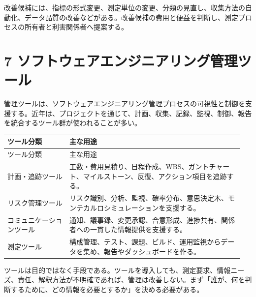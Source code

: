 \documentclass[a4paper,11pt]{ltjsarticle}
\begin{document}
改善候補には、指標の形式変更、測定単位の変更、分類の見直し、収集方法の自動化、データ品質の改善などがある。改善候補の費用と便益を判断し、測定プロセスの所有者と利害関係者へ提案する。

\section{7 ソフトウェアエンジニアリング管理ツール}
管理ツールは、ソフトウェアエンジニアリング管理プロセスの可視性と制御を支援する。近年は、プロジェクトを通じて、計画、収集、記録、監視、制御、報告を統合するツール群が使われることが多い。

\begin{longtable}{>{\raggedright\arraybackslash}p{0.25\linewidth}>{\raggedright\arraybackslash}p{0.70\linewidth}}
\toprule
ツール分類 & 主な用途 \\
\midrule
\endfirsthead
\toprule
ツール分類 & 主な用途 \\
\midrule
\endhead
計画・追跡ツール & 工数・費用見積り、日程作成、WBS、ガントチャート、マイルストーン、反復、アクション項目を追跡する。 \\
リスク管理ツール & リスク識別、分析、監視、確率分布、意思決定木、モンテカルロシミュレーションを支援する。 \\
コミュニケーションツール & 通知、議事録、変更承認、合意形成、進捗共有、関係者への一貫した情報提供を支援する。 \\
測定ツール & 構成管理、テスト、課題、ビルド、運用監視からデータを集め、報告やダッシュボードを作る。 \\
\bottomrule
\end{longtable}

ツールは目的ではなく手段である。ツールを導入しても、測定要求、情報ニーズ、責任、解釈方法が不明確であれば、管理は改善しない。まず「誰が、何を判断するために、どの情報を必要とするか」を決める必要がある。

\begin{center}
\end{center}
\end{document}
